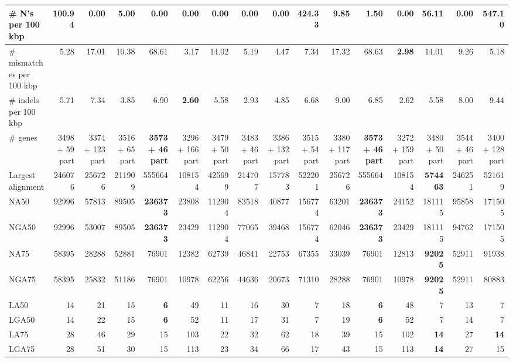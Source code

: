 \documentclass[12pt,a4paper]{article}
\begin{document}
\begin{table}[ht]
\begin{center}
\begin{tabular}{|l*{15}{|r}|}
\# N's per 100 kbp & 100.94 & {\bf 0.00} & 5.00 & {\bf 0.00} & {\bf 0.00} & {\bf 0.00} & {\bf 0.00} & {\bf 0.00} & 424.33 & 9.85 & 1.50 & {\bf 0.00} & 56.11 & {\bf 0.00} & 547.10 \\ \hline
\# mismatches per 100 kbp & 5.28 & 17.01 & 10.38 & 68.61 & 3.17 & 14.02 & 5.19 & 4.47 & 7.34 & 17.32 & 68.63 & {\bf 2.98} & 14.01 & 9.26 & 5.18 \\ \hline
\# indels per 100 kbp & 5.71 & 7.34 & 3.85 & 6.90 & {\bf 2.60} & 5.58 & 2.93 & 4.85 & 6.68 & 9.00 & 6.85 & 2.62 & 5.58 & 8.00 & 9.44 \\ \hline
\# genes & 3498 + 59 part & 3374 + 123 part & 3516 + 65 part & {\bf 3573 + 46 part} & 3296 + 166 part & 3479 + 50 part & 3483 + 46 part & 3386 + 132 part & 3515 + 54 part & 3380 + 117 part & {\bf 3573 + 46 part} & 3272 + 159 part & 3480 + 50 part & 3544 + 46 part & 3400 + 128 part \\ \hline
Largest alignment & 246076 & 256726 & 211909 & 555664 & 108154 & 425699 & 214707 & 157783 & 522201 & 256726 & 555664 & 108154 & {\bf 574463} & 246251 & 521619 \\ \hline
NA50 & 92996 & 57813 & 89505 & {\bf 236373} & 23808 & 112904 & 83518 & 40877 & 156774 & 63201 & {\bf 236373} & 24152 & 181115 & 95858 & 171505 \\ \hline
NGA50 & 92996 & 53007 & 89505 & {\bf 236373} & 23429 & 112904 & 77065 & 39468 & 156774 & 62046 & {\bf 236373} & 23429 & 181115 & 94762 & 171505 \\ \hline
NA75 & 58395 & 28288 & 52881 & 76901 & 12382 & 62739 & 46841 & 22753 & 67355 & 33039 & 76901 & 12813 & {\bf 92025} & 52911 & 91938 \\ \hline
NGA75 & 58395 & 25832 & 51186 & 76901 & 10978 & 62256 & 44636 & 20673 & 71310 & 28288 & 76901 & 10978 & {\bf 92025} & 52911 & 80883 \\ \hline
LA50 & 14 & 21 & 15 & {\bf 6} & 49 & 11 & 16 & 30 & 7 & 18 & {\bf 6} & 48 & 7 & 13 & 7 \\ \hline
LGA50 & 14 & 22 & 15 & {\bf 6} & 52 & 11 & 17 & 31 & 7 & 19 & {\bf 6} & 52 & 7 & 14 & 7 \\ \hline
LA75 & 28 & 46 & 29 & 15 & 103 & 22 & 32 & 62 & 18 & 39 & 15 & 102 & {\bf 14} & 27 & {\bf 14} \\ \hline
LGA75 & 28 & 51 & 30 & 15 & 113 & 23 & 34 & 66 & 17 & 43 & 15 & 113 & {\bf 14} & 27 & 15 \\ \hline
\end{tabular}
\end{center}
\end{table}
\end{document}
